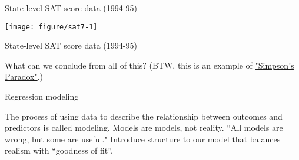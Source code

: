 \documentclass[table]{beamer}\usepackage[]{graphicx}\usepackage[]{color}
\makeatletter
\def\maxwidth{ %
  \ifdim\Gin@nat@width>\linewidth
    \linewidth
  \else
    \Gin@nat@width
  \fi
}
\newenvironment{knitrout}{}{} %
\makeatother
\begin{document}

\begin{frame}[fragile]{State-level SAT score data (1994-95)}

\begin{knitrout}
\color{fgcolor}
\texttt{[image: figure/sat7-1]} 
\end{knitrout}

\end{frame}




\begin{frame}[fragile]{State-level SAT score data (1994-95)}

What can we conclude from all of this? (BTW, this is an example of \href{http://en.wikipedia.org/wiki/Simpson%27s_paradox}{"Simpson's Paradox"}.)

\end{frame}



\begin{frame}{Regression modeling}

The process of using data to describe the relationship between outcomes and predictors is called modeling.
\bi
	\myitem Models are models, not reality.
	\myitem ``All models are wrong, but some are useful."
	\myitem Introduce structure to our model that balances realism with ``goodness of fit''. \ei

\end{frame}




\end{document}
